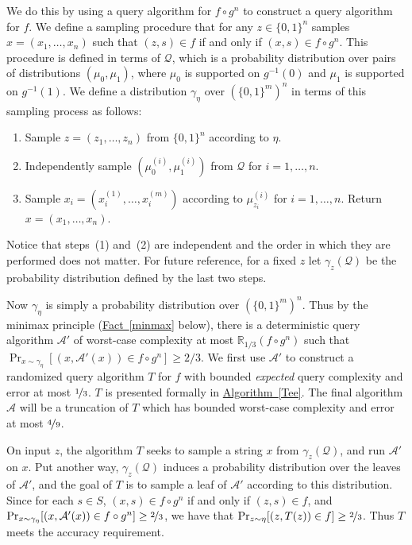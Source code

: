 \documentclass[11pt]{article}
\numberwithin{equation}{section}
\theoremstyle{definition}
\theoremstyle{plain}
\newcommand{\R}{\mathbb R}
\newcommand{\expref}[2]{\hyperref[#2]{#1~\ref{#2}}}
\newcommand{\dr}{\nicefrac}
\newcommand{\clQ}{\mathcal{Q}}
\begin{document}
We do this by using a query algorithm for $f \circ g^n$ to construct a query algorithm for $f$.  We define a sampling procedure that for any $z \in \{0,1\}^n$ samples $x=(x_1, \ldots, x_n)$ such that 
$(z,s) \in f$ if and only if $(x,s) \in f \circ g^n$.  This procedure is defined in terms of $\clQ$, which is a probability distribution over pairs of distributions $(\mu_0,\mu_1)$, where $\mu_0$ is supported on $g^{-1}(0)$ and $\mu_1$ is 
supported on $g^{-1}(1)$.  We define a distribution $\gamma_\eta$ over $(\{0,1\}^m)^n$ in terms of this sampling process as follows:
\begin{enumerate}
\item Sample $z=(z_1, \ldots,z_n)$ from $\{0,1\}^n$ according to $\eta$.
\item Independently sample $(\mu_0^{(i)}, \mu_1^{(i)})$ from $\clQ$ for $i=1, \ldots, n$.
\item Sample $x_i=(x^{(1)}_i, \ldots, x^{(m)}_i)$ according to $\mu_{z_i}^{(i)}$ for $i=1,\ldots, n$.  Return $x=(x_1, \ldots, x_n)$.
\end{enumerate}
Notice that steps~(1) and~(2) are independent and the order in which they are performed does not matter.  For future reference, for a fixed $z$ let $\gamma_z(\clQ)$ be the probability distribution defined by the last two steps.  

Now $\gamma_\eta$ is simply a probability distribution over $(\{0,1\}^m)^n$. Thus by the minimax principle (\expref{Fact}{minmax} below), there is a deterministic query algorithm $\mathcal{A}'$ of worst-case complexity at most 
$\R_{1/3} (f \circ g^n)$ such that $\Pr_{x \sim \gamma_\eta}[(x,\mathcal{A}'(x)) \in f \circ g^n] \geq 2/3$. We first use $\mathcal{A}'$ to construct a randomized query algorithm $T$ for $f$ with bounded \emph{expected} 
query complexity and error at most $\dr13$.  $T$ is presented formally in \expref{Algorithm}{Tee}. The final algorithm $\mathcal{A}$ will be a truncation of $T$ which has bounded worst-case complexity and error at 
most $\dr49$.

On input $z$, the algorithm $T$ seeks to sample a string $x$ from $\gamma_z(\clQ)$, and run $\mathcal{A'}$ on $x$.  Put another way, $\gamma_z(\clQ)$ induces a probability distribution over the 
leaves of $\mathcal{A}'$, and the goal of $T$ is to sample a leaf of $\mathcal{A}'$ according to this distribution.
Since for each $s \in S$, $(x,s) \in f \circ g^n$ if and only if $(z,s) \in f$, and 
$\Pr_{x \sim \gamma_\eta}[(x,\mathcal{A}'(x)) \in f \circ g^n] \geq \dr23$, we have that $\Pr_{z \sim \eta}[(z,T(z)) \in f ] \geq \dr23$. Thus $T$ meets the accuracy requirement.
\end{document}
